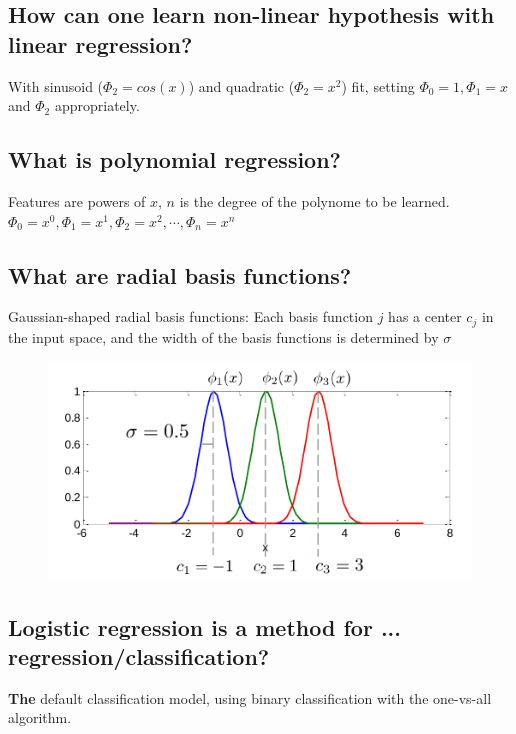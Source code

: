 \documentclass[12pt]{scrartcl}
\begin{document}
\subsection{How can one learn non-linear hypothesis with linear regression?}
With sinusoid ($\Phi_2=cos(x)$) and quadratic ($\Phi_2=x^2$) fit, setting $\Phi_0=1, \Phi_1=x$ and $\Phi_2$ appropriately.

\subsection{What is polynomial regression?}
Features are powers of $x$, $n$ is the degree of the polynome to be learned. \\
$\Phi_0=x^0, \Phi_1=x^1, \Phi_2=x^2, \cdots , \Phi_n=x^n$

\subsection{What are radial basis functions?}
Gaussian-shaped radial basis functions: Each basis function $j$ has a center $c_j$ in the input space, and the width of the basis functions is determined by $\sigma$
\begin{figure}[htb]
  \begin{center}
  \includegraphics[scale=0.45]{gaussian-rbf}
  \end{center}
  \vspace{-\baselineskip}
\end{figure}

\subsection{Logistic regression is a method for ... regression/classification?}
{\bf The} default classification model, using binary classification with the one-vs-all algorithm.
\end{document}

